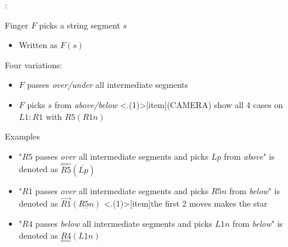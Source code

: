 \begin{frame}{\secname: \subsecname}

Finger $F$ picks a string segment $s$ 

\begin{itemize}
    \item Written as $F(s)$
\end{itemize}

 Four variations:
\begin{itemize}
    \item $F$ passes \emph{over/under} all intermediate segments
    \item $F$ picks $s$ from \emph{above/below}
    \note<.(1)>[item]{(CAMERA) show all 4 cases on $L1:R1$ with $R5(R1n)$}
\end{itemize}

 Examples
\begin{itemize}
    \item "$R5$ passes \emph{over} all intermediate segments and picks $Lp$ from \emph{above}" is denoted  as $\overset\Longleftarrow{R5}(\overline{Lp})$
    \item "$R1$ passes \emph{over} all intermediate segments and picks $R5n$ from \emph{below}" is denoted as $\overrightarrow{R1}(\underline{R5n})$
    \note<.(1)>[item]{the first 2 moves makes the star}
    \item "$R4$ passes \emph{below} all intermediate segments and picks $L1n$ from \emph{below}" is denoted as $\underset\Longleftarrow{R4}(\underline{L1n})$
\end{itemize}
\end{frame}


